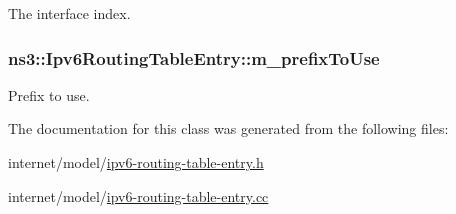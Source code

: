 The interface index. 

\subsubsection[{\texorpdfstring{m\+\_\+prefix\+To\+Use}{m_prefixToUse}}]{ ns3\+::\+Ipv6\+Routing\+Table\+Entry\+::m\+\_\+prefix\+To\+Use\hspace{0.3cm}{\ttfamily [private]}}\hypertarget{classns3_1_1Ipv6RoutingTableEntry_aa4ab4ecb6127d76ac2fff1938043d4f8}{}\label{classns3_1_1Ipv6RoutingTableEntry_aa4ab4ecb6127d76ac2fff1938043d4f8}


Prefix to use. 



The documentation for this class was generated from the following files\+:\begin{DoxyCompactItemize}
\item 
internet/model/\hyperlink{ipv6-routing-table-entry_8h}{ipv6-\/routing-\/table-\/entry.\+h}\item 
internet/model/\hyperlink{ipv6-routing-table-entry_8cc}{ipv6-\/routing-\/table-\/entry.\+cc}\end{DoxyCompactItemize}
